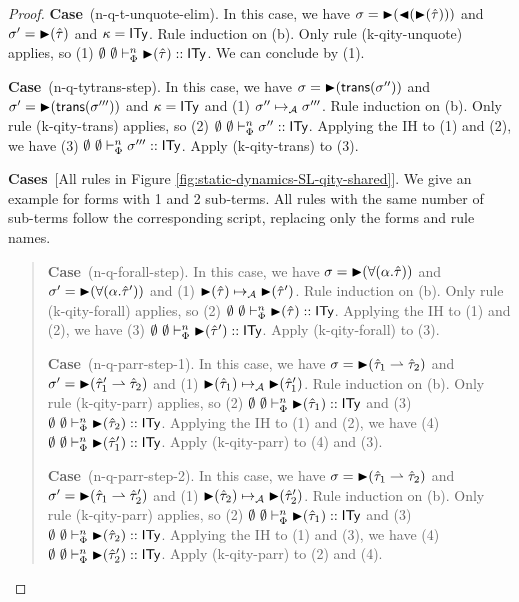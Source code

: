 \documentclass[12pt]{article}
\newcommand{\pfcase}[1]{\textbf{Case}~#1. }
\newcommand{\pfcases}[1]{\textbf{Cases}~#1. }
\begin{document}
\begin{proof}
\pfcase{(n-q-t-unquote-elim)} In this case, we have $\sigma={\blacktriangleright}({\blacktriangleleft}({\blacktriangleright}(\hat{\tau})))$ and $\sigma'={\blacktriangleright}(\hat{\tau})$ and $\kappa={\sf ITy}$. Rule induction on (b). Only rule (k-qity-unquote) applies, so (1) $\emptyset~\emptyset \vdash_{\Phi}^{n} {\blacktriangleright}(\hat{\tau}) :: {\sf ITy}$. We can conclude by (1).

\pfcase{(n-q-tytrans-step)} In this case, we have $\sigma={\blacktriangleright}({\sf trans}(\sigma''))$ and $\sigma'={\blacktriangleright}({\sf trans}(\sigma'''))$ and $\kappa={\sf ITy}$ and (1) $\sigma'' \mapsto_{\mathcal{A}} \sigma'''$. Rule induction on (b). Only rule (k-qity-trans) applies, so (2) $\emptyset~\emptyset \vdash_{\Phi}^{n} \sigma'' :: {\sf ITy}$. Applying the IH to (1) and (2), we have (3) $\emptyset~\emptyset \vdash_{\Phi}^{n} \sigma''' :: {\sf ITy}$. Apply (k-qity-trans) to (3).

\pfcases{[All rules in Figure \ref{fig:static-dynamics-SL-qity-shared}]} We give an example for forms with 1 and 2 sub-terms. All rules with the same number of sub-terms follow the corresponding script, replacing only the forms and rule names.

\begin{quote}
    \pfcase{(n-q-forall-step)} In this case, we have $\sigma={\blacktriangleright}(\forall(\alpha.\hat{\tau}))$ and $\sigma'={\blacktriangleright}(\forall(\alpha.\hat{\tau}'))$ and (1) ${\blacktriangleright}(\hat{\tau}) \mapsto_{\mathcal{A}} {\blacktriangleright}(\hat{\tau}')$. Rule induction on (b). Only rule (k-qity-forall) applies, so (2) $\emptyset~\emptyset \vdash_{\Phi}^{n} {\blacktriangleright}(\hat{\tau}) :: {\sf ITy}$. Applying the IH to (1) and (2), we have (3) $\emptyset~\emptyset \vdash_{\Phi}^{n} {\blacktriangleright}(\hat{\tau}') :: {\sf ITy}$. Apply (k-qity-forall) to (3). 

    \pfcase{(n-q-parr-step-1)} In this case, we have $\sigma={\blacktriangleright}(\hat{\tau}_1 \rightharpoonup \hat{\tau}_2)$ and $\sigma'={\blacktriangleright}(\hat{\tau}_1' \rightharpoonup \hat{\tau}_2)$ and (1) ${\blacktriangleright}(\hat{\tau}_1) \mapsto_{\mathcal{A}} {\blacktriangleright}(\hat{\tau}_1')$. Rule induction on (b). Only rule (k-qity-parr) applies, so (2) $\emptyset~\emptyset \vdash_{\Phi}^{n} {\blacktriangleright}(\hat{\tau}_1) :: {\sf ITy}$ and (3) $\emptyset~\emptyset \vdash_{\Phi}^{n} {\blacktriangleright}(\hat{\tau}_2) :: {\sf ITy}$. Applying the IH to (1) and (2), we have (4) $\emptyset~\emptyset \vdash_{\Phi}^{n} {\blacktriangleright}(\hat{\tau}_1') :: {\sf ITy}$. Apply (k-qity-parr) to (4) and (3).

    \pfcase{(n-q-parr-step-2)} In this case, we have $\sigma={\blacktriangleright}(\hat{\tau}_1 \rightharpoonup \hat{\tau}_2)$ and $\sigma'={\blacktriangleright}(\hat{\tau}_1 \rightharpoonup \hat{\tau}_2')$ and (1) ${\blacktriangleright}(\hat{\tau}_2) \mapsto_{\mathcal{A}} {\blacktriangleright}(\hat{\tau}_2')$. Rule induction on (b). Only rule (k-qity-parr) applies, so (2) $\emptyset~\emptyset \vdash_{\Phi}^{n} {\blacktriangleright}(\hat{\tau}_1) :: {\sf ITy}$ and (3) $\emptyset~\emptyset \vdash_{\Phi}^{n} {\blacktriangleright}(\hat{\tau}_2) :: {\sf ITy}$. Applying the IH to (1) and (3), we have (4) $\emptyset~\emptyset \vdash_{\Phi}^{n} {\blacktriangleright}(\hat{\tau}_2') :: {\sf ITy}$. Apply (k-qity-parr) to (2) and (4).
\end{quote}


\end{proof}
\end{document}
